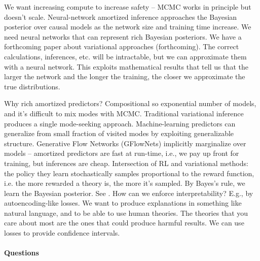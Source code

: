 We want increasing compute to increase safety -- MCMC works in principle but doesn't
scale.
Neural-network amortized inference approaches the Bayesian posterior over causal models
as the network size and training time increase.
We need neural networks that can represent rich Bayesian posteriors.
We have a forthcoming paper about variational approaches (forthcoming).
The correct calculations, inferences, etc. will be intractable, but we can approximate
them with a neural network.
This exploits mathematical results that tell us that the larger the network and the
longer the training, the closer we approximate the true distributions.

Why rich amortized predictors?
Compositional so exponential number of models, and it's difficult to mix modes with
MCMC.
Traditional variational inference produces a single mode-seeking approach.
Machine-learning predictors can generalize from small fraction of visited modes by
exploiting generalizable structure.
Generative Flow Networks (GFlowNets) implicitly marginalize over models -- amortized
predictors are fast at run-time, i.e., we pay up front for training, but inferences are
cheap.
Intersection of RL and variational methods: the policy they learn stochastically
samples proportional to the reward function, i.e. the more rewarded a theory is, the
more it's sampled.
By Bayes's rule, we learn the Bayesian posterior.
See \textcites{Deleu2022,Deleu2023}.
How can we enforce interpretability?
E.g., by autoencoding-like losses.
We want to produce explanations in something like natural language, and to be able to
use human theories.
The theories that you care about most are the ones that could produce harmful results.
We can use losses to provide confidence intervals.

\paragraph{Questions}

